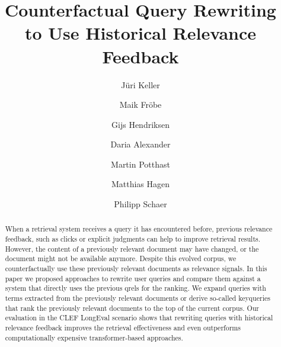 \title{Counterfactual Query Rewriting \\ to Use Historical Relevance Feedback}

\author{
    Jüri Keller  \and
    Maik Fr{\"{o}}be  \and
    Gijs Hendriksen  \and
    Daria Alexander  \and
    Martin Potthast  \and
    Matthias Hagen  \and
    Philipp Schaer  
}



\maketitle

\begin{abstract}
    When a retrieval system receives a query it has encountered before, previous relevance feedback, such as clicks or explicit judgments can help to improve retrieval results. However, the content of a previously relevant document may have changed, or the document might not be available anymore. Despite this evolved corpus, we counterfactually use these previously relevant documents as relevance signals. 
    In this paper we proposed approaches to rewrite user queries and compare them against a system that directly uses the previous qrels for the ranking. We expand queries with terms extracted from the previously relevant documents or derive so-called keyqueries that rank the previously relevant documents to the top of the current corpus. 
    Our evaluation in the CLEF LongEval scenario shows that rewriting queries with historical relevance feedback improves the retrieval effectiveness and even outperforms computationally expensive transformer-based approaches.

\end{abstract}
